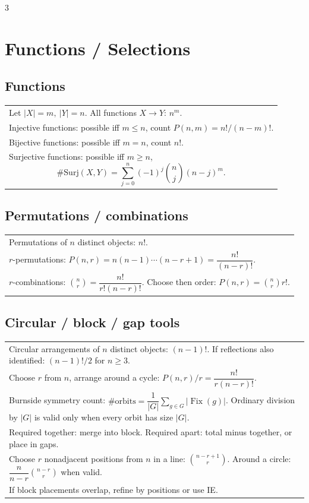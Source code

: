 \documentclass[10pt]{article}
\newcommand{\Fix}{\operatorname{Fix}}
\begin{document}
\begin{multicols*}{3}
\section*{Functions / Selections}
\subsection*{Functions}
\begin{tabular}{@{}p{}@{}}
Let \(|X|=m,\ |Y|=n\). All functions \(X\to Y\): \(n^m\).\\
Injective functions: possible iff \(m\le n\), count \(P(n,m)=n!/(n-m)!\).\\
Bijective functions: possible iff \(m=n\), count \(n!\).\\
Surjective functions: possible iff \(m\ge n\),
\[
\#\mathrm{Surj}(X,Y)=\sum_{j=0}^{n}(-1)^j\binom nj(n-j)^m.
\]
\end{tabular}

\subsection*{Permutations / combinations}
\begin{tabular}{@{}p{}@{}}
Permutations of \(n\) distinct objects: \(n!\).\\
\(r\)-permutations: \(P(n,r)=n(n-1)\cdots(n-r+1)=\dfrac{n!}{(n-r)!}\).\\
\(r\)-combinations: \(\binom nr=\dfrac{n!}{r!(n-r)!}\). Choose then order: \(P(n,r)=\binom nr r!\).\\
\end{tabular}

\subsection*{Circular / block / gap tools}
\begin{tabular}{@{}p{}@{}}
Circular arrangements of \(n\) distinct objects: \((n-1)!\). If reflections also identified: \((n-1)!/2\) for \(n\ge3\).\\
Choose \(r\) from \(n\), arrange around a cycle: \(P(n,r)/r=\dfrac{n!}{r(n-r)!}\).\\
Burnside symmetry count: \(\#\text{orbits}=\dfrac1{|G|}\sum_{g\in G}|\Fix(g)|\). Ordinary division by \(|G|\) is valid only when every orbit has size \(|G|\).\\
Required together: merge into block. Required apart: total minus together, or place in gaps.\\
Choose \(r\) nonadjacent positions from \(n\) in a line: \(\binom{n-r+1}{r}\). Around a circle: \(\dfrac{n}{n-r}\binom{n-r}{r}\) when valid.\\
If block placements overlap, refine by positions or use IE.\\
\end{tabular}


\end{multicols*}
\end{document}
